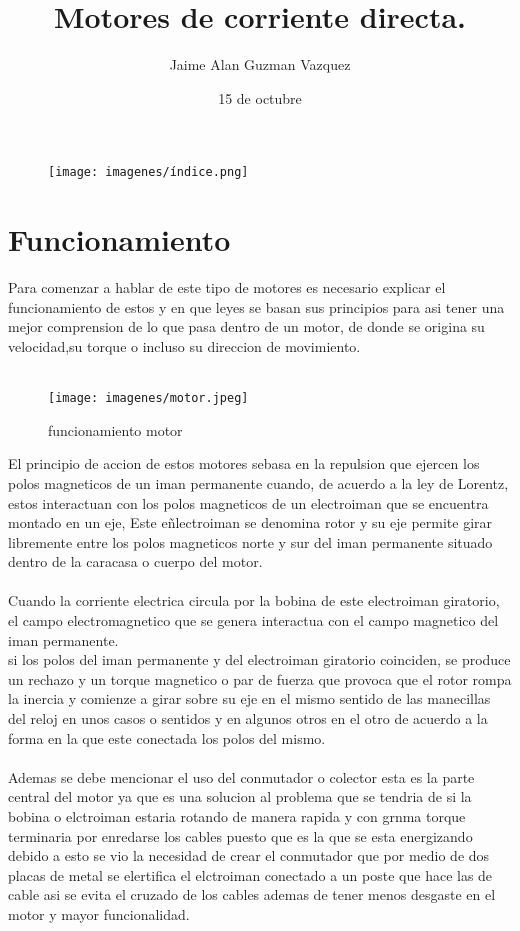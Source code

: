 \documentclass[12pt]{article}
\title{\textbf{Motores de corriente directa.}}
\author{Jaime Alan Guzman Vazquez }
\date{15 de octubre}
\begin{document}
\begin{figure}[htp]
\centering
\texttt{[image: imagenes/índice.png]}
\caption{}
\label{}
\end{figure}
\maketitle

\section{Funcionamiento}
Para comenzar a hablar de este tipo de motores es necesario explicar el funcionamiento de estos y en que leyes se basan sus principios para asi tener una mejor comprension de lo que pasa dentro de un motor, de donde se origina su velocidad,su torque o incluso su direccion de movimiento.\\\\
\begin{figure}[htp]
\centering
\texttt{[image: imagenes/motor.jpeg]}
\caption{funcionamiento motor}
\label{funcionamiento de un motor electrico DC}
\end{figure}
El principio de accion de estos motores sebasa en la repulsion que ejercen los polos magneticos de un iman permanente cuando, de acuerdo a la ley de Lorentz, estos interactuan con los polos magneticos de un electroiman que se encuentra montado en un eje, Este eñlectroiman se denomina rotor y su eje permite girar libremente entre los polos magneticos norte y sur del iman permanente situado dentro de la caracasa o cuerpo del motor.\\\\

Cuando la corriente electrica circula por la bobina de este electroiman  giratorio, el campo electromagnetico que se genera interactua con el campo magnetico del iman permanente.\\ 

si los polos del iman permanente y del electroiman giratorio coinciden, se produce un rechazo y un torque magnetico o par de fuerza  que provoca que el rotor rompa la inercia y comienze a girar sobre su eje en el mismo sentido de las manecillas del reloj en unos casos o sentidos y en algunos otros en el otro de acuerdo a la forma en la que este conectada los polos del mismo.\\\\

Ademas se debe mencionar el uso del conmutador o colector esta es la parte central del motor ya que es una solucion al problema que se tendria de si la bobina o elctroiman  estaria rotando de manera rapida y con grnma torque terminaria por enredarse los cables puesto que es la que se esta energizando debido a esto se vio la necesidad de crear el conmutador que por medio de dos placas de metal se elertifica el elctroiman conectado a un poste que hace las de cable asi se evita el cruzado de los cables  ademas de tener menos desgaste en el motor y mayor funcionalidad.\\
\end{document}
